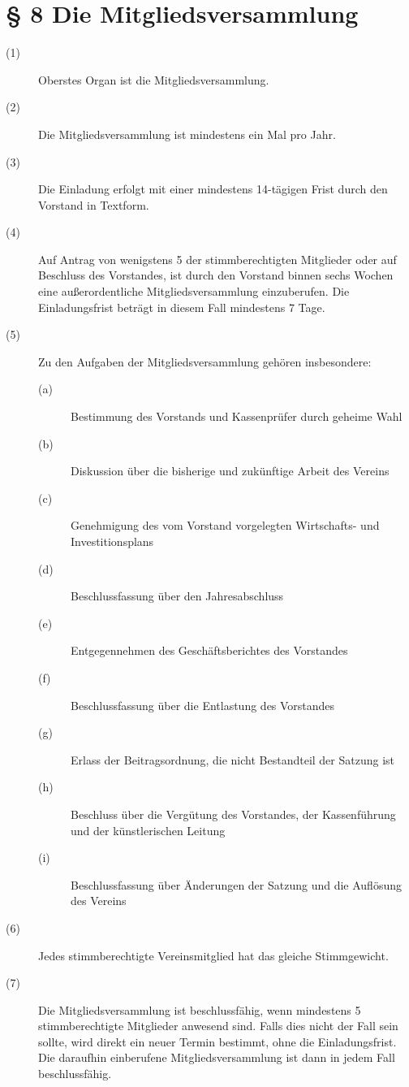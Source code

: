 \documentclass[a4paper,12pt]{scrartcl}
\begin{document}
\section*{\S{} 8 Die Mitgliedsversammlung}
\begin{description} 

\item[(1)] Oberstes Organ ist die Mitgliedsversammlung.
\item[(2)] Die Mitgliedsversammlung ist mindestens ein Mal pro Jahr.
\item[(3)] Die Einladung erfolgt mit einer mindestens 14-tägigen Frist durch den Vorstand in Textform.
\item[(4)] Auf Antrag von wenigstens 5 der stimmberechtigten Mitglieder oder auf Beschluss des Vorstandes, ist durch den Vorstand binnen sechs Wochen eine außerordentliche Mitgliedsversammlung einzuberufen. Die Einladungsfrist beträgt in diesem Fall mindestens 7 Tage.
\item[(5)] Zu den Aufgaben der Mitgliedsversammlung gehören insbesondere:
\begin{description} 
\item[(a)] Bestimmung des Vorstands und Kassenprüfer durch geheime Wahl
\item[(b)] Diskussion über die bisherige und zukünftige Arbeit des Vereins
\item[(c)] Genehmigung des vom Vorstand vorgelegten Wirtschafts- und Investitionsplans
\item[(d)] Beschlussfassung über den Jahresabschluss
\item[(e)] Entgegennehmen des Geschäftsberichtes des Vorstandes
\item[(f)] Beschlussfassung über die Entlastung des Vorstandes
\item[(g)] Erlass der Beitragsordnung, die nicht Bestandteil der Satzung ist
\item[(h)] Beschluss über die Vergütung des Vorstandes, der Kassenführung und der künstlerischen Leitung
\item[(i)] Beschlussfassung über Änderungen der Satzung und die Auflösung des Vereins 
\end{description}
\item[(6)] Jedes stimmberechtigte Vereinsmitglied hat das gleiche Stimmgewicht.
\item[(7)] Die Mitgliedsversammlung ist beschlussfähig, wenn mindestens 5 stimmberechtigte Mitglieder anwesend sind. Falls dies nicht der Fall sein sollte, wird direkt ein neuer Termin bestimmt, ohne die Einladungsfrist. Die daraufhin einberufene Mitgliedsversammlung ist dann in jedem Fall beschlussfähig.

\end{description}
\end{document}
